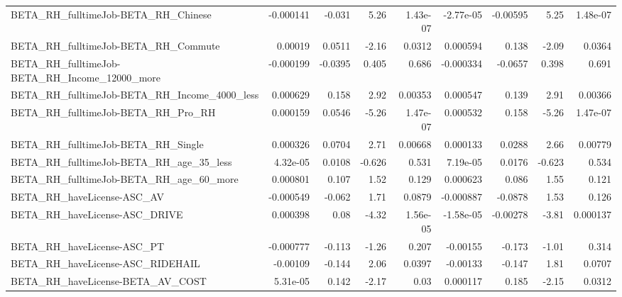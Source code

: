 \begin{tabular}{lrrrrrrrr}
BETA\_RH\_fulltimeJob-BETA\_RH\_Chinese                &   -0.000141 &       -0.031 &      5.26 & 1.43e-07 &  -2.77e-05 &    -0.00595 &         5.25 &      1.48e-07 \\
BETA\_RH\_fulltimeJob-BETA\_RH\_Commute                &     0.00019 &       0.0511 &     -2.16 &   0.0312 &   0.000594 &       0.138 &        -2.09 &        0.0364 \\
BETA\_RH\_fulltimeJob-BETA\_RH\_Income\_12000\_more      &   -0.000199 &      -0.0395 &     0.405 &    0.686 &  -0.000334 &     -0.0657 &        0.398 &         0.691 \\
BETA\_RH\_fulltimeJob-BETA\_RH\_Income\_4000\_less       &    0.000629 &        0.158 &      2.92 &  0.00353 &   0.000547 &       0.139 &         2.91 &       0.00366 \\
BETA\_RH\_fulltimeJob-BETA\_RH\_Pro\_RH                 &    0.000159 &       0.0546 &     -5.26 & 1.47e-07 &   0.000532 &       0.158 &        -5.26 &      1.47e-07 \\
BETA\_RH\_fulltimeJob-BETA\_RH\_Single                 &    0.000326 &       0.0704 &      2.71 &  0.00668 &   0.000133 &      0.0288 &         2.66 &       0.00779 \\
BETA\_RH\_fulltimeJob-BETA\_RH\_age\_35\_less            &    4.32e-05 &       0.0108 &    -0.626 &    0.531 &   7.19e-05 &      0.0176 &       -0.623 &         0.534 \\
BETA\_RH\_fulltimeJob-BETA\_RH\_age\_60\_more            &    0.000801 &        0.107 &      1.52 &    0.129 &   0.000623 &       0.086 &         1.55 &         0.121 \\
BETA\_RH\_haveLicense-ASC\_AV                         &   -0.000549 &       -0.062 &      1.71 &   0.0879 &  -0.000887 &     -0.0878 &         1.53 &         0.126 \\
BETA\_RH\_haveLicense-ASC\_DRIVE                      &    0.000398 &         0.08 &     -4.32 & 1.56e-05 &  -1.58e-05 &    -0.00278 &        -3.81 &      0.000137 \\
BETA\_RH\_haveLicense-ASC\_PT                         &   -0.000777 &       -0.113 &     -1.26 &    0.207 &   -0.00155 &      -0.173 &        -1.01 &         0.314 \\
BETA\_RH\_haveLicense-ASC\_RIDEHAIL                   &    -0.00109 &       -0.144 &      2.06 &   0.0397 &   -0.00133 &      -0.147 &         1.81 &        0.0707 \\
BETA\_RH\_haveLicense-BETA\_AV\_COST                   &    5.31e-05 &        0.142 &     -2.17 &     0.03 &   0.000117 &       0.185 &        -2.15 &        0.0312 \\

\end{tabular}
